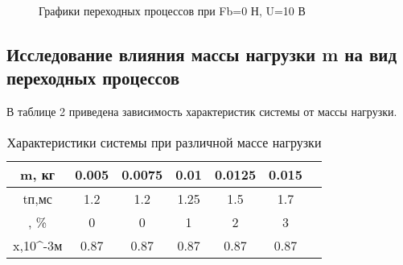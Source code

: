 \documentclass[a4paper, 12pt]{article}
\begin{document}
\begin{figure}[h!]
\begin{minipage}[h]{0.49\linewidth}
\end{minipage}
\hfill
\begin{minipage}[h]{0.49\linewidth}
\end{minipage}
\vfill
\begin{minipage}[h]{0.49\linewidth}
\end{minipage}
\hfill
\begin{minipage}[h]{0.49\linewidth}
\end{minipage}
\caption{Графики переходных процессов при Fb=0 Н, U=10 В}
\end{figure}
\newpage
\begin{center}
\section{Исследование влияния массы нагрузки m на вид переходных процессов}
\end{center}\par
В таблице 2 приведена зависимость характеристик системы от массы нагрузки.
\begin{table}[h!]
	\caption{Характеристики системы при различной массе нагрузки }
	\renewcommand{\arraystretch}{1}
	\renewcommand{\tabcolsep}{0.9cm}
	\begin{tabular}{|c|c|c|c|c|c|c|}
		\hline
		m, кг	&	0.005	&	0.0075	&	0.01	&	0.0125	&	0.015	\\
		\hline
		tп,мс	&	1.2	&	1.2	&	1.25	&	1.5	&	1.7	\\
		\hline
		\sigma, \%	&	0	&	0	&	1	&	2	&	3	\\
		\hline
		x,10^{-3}м	&	0.87	&	0.87	&	0.87	&	0.87	&	0.87	\\
		\hline
	\end{tabular}
\end{table}
\newpage
\end{document}
